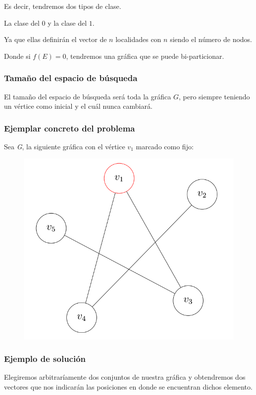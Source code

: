 \documentclass{article}
\begin{document}
Es decir, tendremos dos tipos de clase.

La clase del $0$ y la clase del $1$.

Ya que ellas definirán el vector de $n$ localidades con $n$ 
siendo el número de nodos.

Donde si $f(E) = 0$, tendremos una gráfica que se puede 
bi-particionar.

\subsubsection*{Tamaño del espacio de búsqueda}
El tamaño del espacio de búsqueda será toda la gráfica $G$, pero
siempre teniendo un vértice como inicial y el cuál nunca cambiará.
\subsubsection*{Ejemplar concreto del problema}
Sea \textit{G}, la siguiente gráfica con el vértice $v_1$ marcado como 
fijo:
\begin{figure}[h]
\begin{center}
\includegraphics[scale=0.25]{./img/graphExample}
\end{center}
\end{figure}
\subsubsection*{Ejemplo de solución}
Elegiremos arbitraríamente dos conjuntos de nuestra gráfica y 
obtendremos dos vectores que nos indicarán las posiciones en donde se
encuentran dichos elemento.
\end{document}
